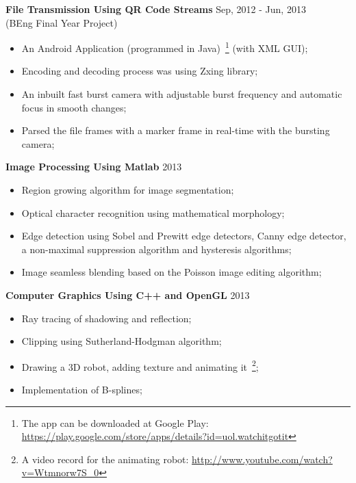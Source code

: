 \documentclass[line,margin]{res}
\begin{document}
\begin{resume}
{\bf File Transmission Using QR Code Streams}
\hfill{\textcolor[rgb]{0.7,0.7,0.7}{Sep, 2012 - Jun, 2013}}\\
(BEng Final Year Project)
\begin{itemize}\itemsep -2pt %
    \item An Android Application (programmed in Java)~\footnote{The app can be downloaded at Google Play: \url{https://play.google.com/store/apps/details?id=uol.watchitgotit}} (with XML GUI);
    \item Encoding and decoding process was using Zxing library;
    \item An inbuilt fast burst camera with adjustable burst frequency and automatic focus in smooth changes;
    \item Parsed the file frames with a marker frame in real-time with the bursting camera;
\end{itemize}

{\bf Image Processing Using Matlab}
\hfill{\textcolor[rgb]{0.7,0.7,0.7}{2013}}
\begin{itemize}\itemsep -2pt %
    \item Region growing algorithm for image segmentation;
    \item Optical character recognition using mathematical morphology;
    \item Edge detection using Sobel and Prewitt edge detectors, Canny edge detector, a non-maximal suppression algorithm and hysteresis algorithms;
    \item Image seamless blending based on the Poisson image editing algorithm;
\end{itemize}

{\bf Computer Graphics Using C++ and OpenGL}
\hfill{\textcolor[rgb]{0.7,0.7,0.7}{2013}}
\begin{itemize}\itemsep -2pt %
    \item Ray tracing of shadowing and reflection;
    \item Clipping using Sutherland-Hodgman algorithm;
    \item Drawing a 3D robot, adding texture and animating it~\footnote{A video record for the animating robot: \url{http://www.youtube.com/watch?v=Wtmnorw7S_0}};
    \item Implementation of B-splines;
\end{itemize}









\end{resume}
\end{document}
